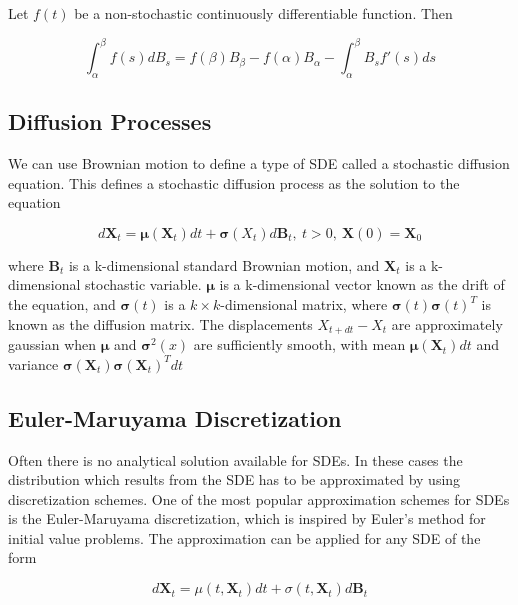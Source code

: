 \cite{iacus_simulation_2008}


Let $f(t)$ be a non-stochastic continuously differentiable function. Then

$$\int_\alpha^\beta f(s)dB_s = f(\beta)B_\beta - f(\alpha)B_\alpha - \int_\alpha^\beta B_sf'(s) ds   $$



\subsection{Diffusion Processes}
\label{sec: diffusion processes}
We can use Brownian motion to define a type of SDE called a stochastic diffusion equation. This defines a stochastic diffusion process as the solution to the equation

\begin{equation}
    d{\textbf{X}}_t = {\pmb{\mu}} ({\textbf{X}}_t )dt + \pmb{\sigma}({X}_t ) d\textbf{B}_t, \   t > 0 , \ \textbf{X}(0) = \textbf{X}_0
\end{equation}

where $\textbf{B}_t$ is a k-dimensional standard Brownian motion, and $\textbf{X}_t$ is a k-dimensional stochastic variable. $\pmb{\mu}$ is a k-dimensional vector known as the drift of the equation, and $\pmb{\sigma}(t)$ is a $k\times k$-dimensional matrix, where $\pmb{\sigma}(t)\pmb{\sigma}(t)^T$ is known as the diffusion matrix. The displacements $X_{t+dt} - X_t$ are approximately gaussian when $\pmb{\mu}$ and $\pmb{\sigma}^2(x)$ are sufficiently smooth, with mean $\pmb{\mu}(\textbf{X}_t)dt$ and variance $\pmb{\sigma}(\textbf{X}_t)\pmb{\sigma}(\textbf{X}_t)^Tdt$ \cite{bhattacharya_continuous_2023}




\subsection{Euler-Maruyama  Discretization}
\label{subsec: Euler-Maruyama}
Often there is no analytical solution available for SDEs. In these cases the distribution which results from the SDE has to be approximated by using discretization schemes.  One of the most popular approximation schemes for SDEs is the Euler-Maruyama discretization, which is inspired by Euler's method for initial value problems. The approximation can be applied for any SDE of the form

\begin{equation}
    d\textbf{X}_t = \mu(t, \textbf{X}_t)dt + \sigma(t, \textbf{X}_t)d\textbf{B}_t
\end{equation}

